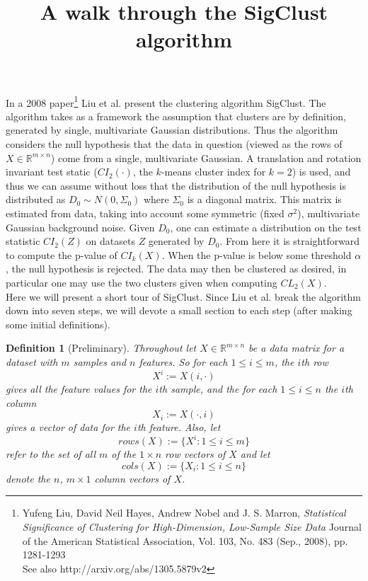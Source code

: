 \documentclass{article}
\title{A walk through the SigClust algorithm}
\date{}
\author{}
\newtheorem{definition}[theorem]{Definition}
\begin{document}
\maketitle

%

In a 2008 paper\footnote{Yufeng Liu, David Neil Hayes, Andrew Nobel and J. S. Marron, \emph{Statistical Significance of Clustering for High-Dimension, Low-Sample Size Data} Journal of the American Statistical Association, Vol. 103, No. 483 (Sep., 2008), pp. 1281-1293\\ See also http://arxiv.org/abs/1305.5879v2}
Liu et al. present the clustering algorithm SigClust. The algorithm takes as a framework the assumption that clusters are by definition, generated by single, multivariate Gaussian distributions. Thus the algorithm considers the null hypothesis that the data in question (viewed as the rows of $X\in \mathbb{R}^{m \times n}$) come from a single, multivariate Gaussian.  A translation and rotation invariant test static ($CI_{2}(\cdot)$, the $k$-means cluster index for $k=2$) is used, and thus we can assume without loss that the distribution of the null hypothesis is distributed as $D_{0} \sim N(0, \Sigma_{0})$ where $\Sigma_{0}$ is a diagonal matrix. This matrix is estimated from data, taking into account some symmetric (fixed $\sigma^{2}$), multivariate Gaussian background noise. Given $D_0$, one can estimate a distribution on the test statistic $CI_{2}(Z)$ on datasets $Z$ generated by $D_0$. From here it is straightforward to compute the p-value of $CI_{k}(X)$. When the p-value is below some threshold $\alpha$, the null hypothesis is rejected. The data may then be clustered as desired, in particular one may use the two clusters given when computing $CL_{2}(X)$.\\

\indent Here we will present a short tour of SigClust. Since Liu et al. break the algorithm down into seven steps, we will devote a small section to each step (after making some initial definitions). \\

\begin{definition}[Preliminary]
Throughout let $X\in \mathbb{R}^{m\times n}$ be a data matrix for a dataset with $m$ samples and $n$ features.
So for each $1 \leq i \leq m$, the $i$th \emph{row}
$$X^{i} := X(i,\cdot)$$
gives all the feature values for the $i$th \emph{sample}, and the for each $1\leq i \leq n$ the $i$th \emph{column}
$$X_{i} := X(\cdot, i)$$
 gives a vector of data for the $i$th \emph{feature}.
Also, let 
$$rows(X):= \{X^{i}: 1\leq i \leq m \}$$
refer to the set of all $m$ of the $1\times n$ row vectors of $X$ and let 
$$cols(X):=\{X_{i}: 1\leq i \leq n\}$$ denote the $n$, $m\times 1$ column vectors of $X$.
\end{definition}
\end{document}

